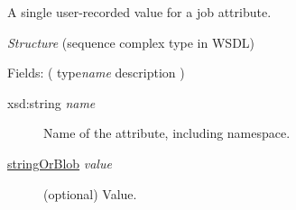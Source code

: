 A single user-recorded value for a job attribute.

{\em{Structure}} (sequence complex type in WSDL)

Fields: ( type{\ttfamily\itshape{{name}}} description )

\begin{description}
\item[{xsd:string {\ttfamily\itshape{{name}}}}]\null{}
Name of the attribute, including namespace.
\item[{\hyperlink{type:stringOrBlob}{stringOrBlob} {\ttfamily\itshape{{value}}}}]\null{}
(optional) Value.
\end{description}
\noindent 
